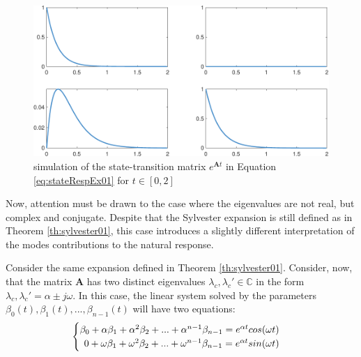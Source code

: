 \documentclass[a4paper,11pt]{book}
\numberwithin{figure}{chapter}
\numberwithin{equation}{chapter}
\numberwithin{table}{chapter}
\newtheorem{theorem}{Theorem}[chapter]
\theoremstyle{definition}
\newcounter{boxed-theorem}
\newenvironment{boxed-theorem}[1]
{\begin{shaded} \begin{theorem}{#1}}
{\end{theorem} \end{shaded}}
\newcounter{boxed-definition}
\begin{document}
\begin{figure}[ht]
	\centering
	\includegraphics[width=\textwidth]{chapter2/stateTrans01}
	\caption{simulation of the state-transition matrix $e^{\bm{A} t}$ in Equation \eqref{eq:stateRespEx01} for $t \in [0,2]$}
	\label{fig:stateTrans01}
\end{figure}

Now, attention must be drawn to the case where the eigenvalues are not real, but complex and conjugate. Despite that the Sylvester expansion is still defined as in Theorem \ref{th:sylvester01}, this case introduces a slightly different interpretation of the modes contributions to the natural response.

\begin{boxed-theorem}{} \label{th:sylvester02}
    Consider the same expansion defined in Theorem \ref{th:sylvester01}. Consider, now, that the matrix $\bm{A}$ has two distinct eigenvalues $\lambda_c, \lambda_c' \in \mathbb{C}$ in the form $\lambda_c, \lambda_c' = \alpha \pm j \omega$. In this case, the linear system solved by the parameters $\beta_0(t), \beta_1(t), ..., \beta_{n-1}(t)$ will have two equations:
    \begin{align} \label{eq:sylvEq01}
    \begin{cases}
        \beta_0 + \alpha \beta_1 + \alpha^{2} \beta_2 + ... + \alpha^{n-1} \beta_{n-1} = e^{\alpha t} cos(\omega t) & \\
        \hfill 0 + \omega \beta_1 + \omega^{2} \beta_2 + ... + \omega^{n-1} \beta_{n-1} = e^{\alpha t} sin(\omega t) &
    \end{cases}
    \end{align}
\end{boxed-theorem}
\end{document}
